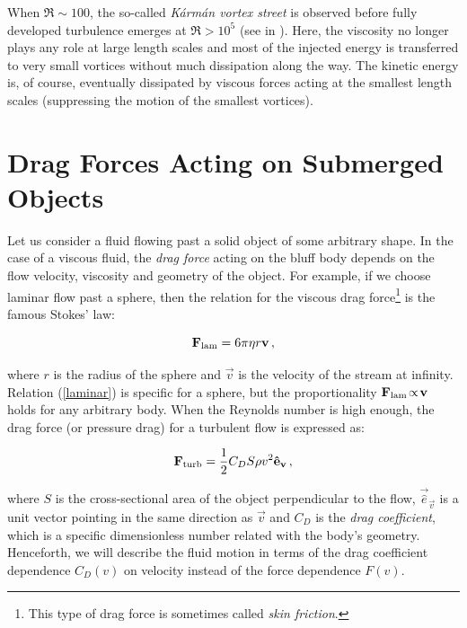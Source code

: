When $\Re \sim 100$, the so-called \textit{K\'arm\'an vortex street} is observed before fully developed turbulence emerges at $\Re > 10^5$ (see in \cite{turbulence}). Here, the viscosity no longer plays any role at large length scales and most of the injected energy is transferred to very small vortices without much dissipation along the way. The kinetic energy is, of course, eventually dissipated by viscous forces acting at the smallest length scales (suppressing the motion of the smallest vortices).


\section{Drag Forces Acting on Submerged Objects}

Let us consider a fluid flowing past a solid object of some arbitrary shape. In the case of a viscous fluid, the \textit{drag force} acting on the bluff body depends on the flow velocity, viscosity and geometry of the object. For example, if we choose laminar flow past a sphere, then the relation for the viscous drag force\footnote{This type of drag force is sometimes called \textit{skin friction}.} is the famous Stokes' law:

\begin{equation}
\mathbf{F}_{\mathrm{lam}} = 6\pi \eta r \mathbf{v}\,,
\label{laminar}
\end{equation}

where $r$ is the radius of the sphere and $ \vec{v} $ is the velocity of the stream at infinity. Relation (\ref{laminar}) is specific for a sphere, but the proportionality $\mathbf{F}_{\mathrm{lam}}\!\propto\!\mathbf{v}$ holds for any arbitrary body.
When the Reynolds number is high enough, the drag force (or pressure drag) for a turbulent flow is expressed as:

\begin{equation}
\mathbf{F}_{\mathrm{turb}} = \frac{1}{2} C_D S \rho v^2 \mathbf{\hat{e}}_{\mathbf{v}}\,,
\label{turbulent}
\end{equation}

where $S$ is the cross-sectional area of the object perpendicular to the flow, $\vec{\hat{e}}_{\vec{v}}$ is a unit vector pointing in the same direction as $\vec{v}$ and $C_D$ is the \textit{drag coefficient}, which is a specific dimensionless number related with the body's geometry.
Henceforth, we will describe the fluid motion in terms of the drag coefficient dependence $C_D(v)$ on velocity instead of the force dependence $F(v)$.

